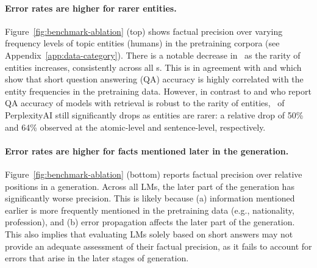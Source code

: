 \paragraph{Error rates are higher for rarer entities.} 
Figure~\ref{fig:benchmark-ablation} (top) shows factual precision over varying frequency levels of topic entities (humans) in the pretraining corpora (see Appendix~\ref{app:data-category}).
There is a notable decrease in \ours\ as the rarity of entities increases, consistently across all \subjectLM{}s.
This is in agreement with \citet{kandpal2022large} and \citet{mallen2022not} which show that short question answering (QA) accuracy is highly correlated with the entity frequencies in the pretraining data. %
However, in contrast to \citet{kandpal2022large} and \citet{mallen2022not} who report QA accuracy of models with retrieval 
is robust to the rarity of entities,
\ours\ of PerplexityAI still significantly drops as entities are rarer: a relative drop of 50\% and 64\% observed at the atomic-level and sentence-level, respectively.

\vspace{-.3em}
\paragraph{Error rates are higher for facts mentioned later in the generation.} 
Figure~\ref{fig:benchmark-ablation} (bottom) reports factual precision over relative positions in a generation. %
Across all LMs, the later part of the generation has significantly worse precision. This is likely because (a) information mentioned earlier is more frequently mentioned in the pretraining data (e.g., nationality, profession), and (b) error propagation affects the later part of the generation.
This also implies that evaluating LMs solely based on short answers may not provide an adequate assessment of their factual precision, as it fails to account for errors that arise in the later stages of generation.

